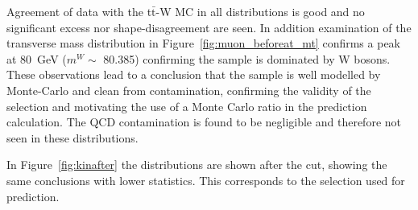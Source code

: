 Agreement of data with the t$\bar{\textrm{t}}$-W MC in all distributions is good and no significant excess nor shape-disagreement are seen. In addition examination of the transverse mass distribution in Figure~\ref{fig:muon_beforeat_mt} confirms a peak at 80~GeV ($m^{W} \sim$ 80.385) confirming the sample is dominated by W bosons. These observations lead to a conclusion that the sample is well modelled by Monte-Carlo and clean from contamination, confirming the validity of the selection and motivating the use of a Monte Carlo ratio in the prediction calculation. The QCD contamination is found to be negligible and therefore not seen in these distributions.

In Figure~\ref{fig:kinafter} the distributions are shown after the \alt cut, showing the same conclusions with lower statistics. This corresponds to the selection used for prediction.





